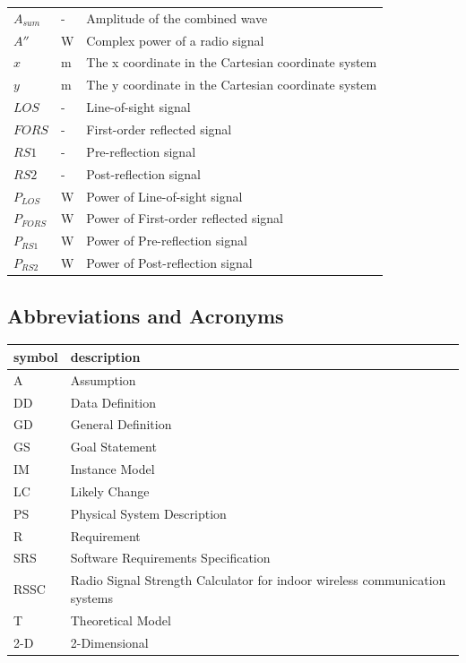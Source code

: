 \documentclass[12pt]{article}
\begin{document}
\begin{longtable*}{l l p{12cm}}
\\
$A_{sum}$ & {-} & Amplitude of the combined wave
\\
$A''$ & \si[per-mode=symbol] {\watt} & Complex power of a radio signal
\\
$x$ & \si[per-mode=symbol] {\metre} & The x coordinate in the Cartesian coordinate 
system
\\
$y$ & \si[per-mode=symbol] {\metre} & The y coordinate in the Cartesian coordinate 
system
\\
$LOS$ & \si[per-mode=symbol] {-} & Line-of-sight signal
\\
$FORS$ & \si[per-mode=symbol] {-} & First-order reflected signal
\\
$RS1$ & \si[per-mode=symbol] {-} & Pre-reflection signal
\\
$RS2$ & \si[per-mode=symbol] {-} & Post-reflection signal
\\
$P_{LOS}$ & \si[per-mode=symbol] {\watt} & Power of Line-of-sight signal
\\
$P_{FORS}$ & \si[per-mode=symbol] {\watt} & Power of First-order reflected signal
\\
$P_{RS1}$ & \si[per-mode=symbol] {\watt} & Power of Pre-reflection signal
\\
$P_{RS2}$ & \si[per-mode=symbol] {\watt} & Power of Post-reflection signal
\\
\bottomrule
\end{longtable*}

\subsection{Abbreviations and Acronyms}

\renewcommand{\arraystretch}{1.2}
\begin{tabular}{l l} 
  \toprule		
  \textbf{symbol} & \textbf{description}\\
  \midrule 
  A & Assumption\\
  DD & Data Definition\\
  GD & General Definition\\
  GS & Goal Statement\\
  IM & Instance Model\\
  LC & Likely Change\\
  PS & Physical System Description\\
  R & Requirement\\
  SRS & Software Requirements Specification\\
  RSSC & Radio Signal Strength Calculator for indoor wireless communication systems\\
  T & Theoretical Model\\
  2-D & 2-Dimensional\\
  \bottomrule
\end{tabular}\\
\end{document}
